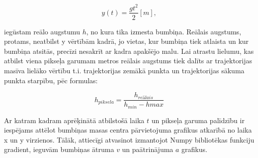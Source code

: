 \documentclass{article}
\begin{document}
\begin{equation}
    y(t)=\frac{gt^2}{2} [m],
\end{equation}

 iegūstam reālo augstumu $h$, no kura tika izmesta bumbiņa.
 Reālais augstums, protams, neatbilst y vērtībām kadrā, jo vietas, kur bumbiņa tiek atlaista un kur bumbiņa atsitās, precīzi nesakrīt ar kadra apakšējo malu. 
 Lai atrastu lielumu, kas atbilst viena pikseļa garumam metros reālais augstums tiek dalīts ar trajektorijas masīva lielāko vērtību t.i. trajektorijas zemākā punkta un trajektorijas sākuma punkta starpību, pēc formulas:

 \begin{equation}
     h_{piksela}=\frac{h_{reālais}}{h_{min}-h{max}}
 \end{equation}

 Ar katram kadram aprēķinātā atbilstošā laika $t$ un pikseļa garuma palīdzību ir iespējams attēlot bumbiņas masas centra pārvietojuma grafikus atkarībā no laika x un y virzienos.
 Tālāk, attiecīgi atvasinot izmantojot Numpy bibliotēkas funkciju gradient, ieguvām bumbiņas ātruma $v$ un paātrinājuma $a$ grafikus.

 
 
\end{document}
